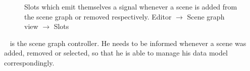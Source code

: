 \documentclass[%
    a4paper,    %
    justified,  %
    nobib,      %
    openany     %
]{tufte-book}
\makeatletter
\renewcommand{\label}[1]{\@tufte@label{##1}}%
\makeatother
\begin{document}
\begin{figure}
\begin{flushleft}
\begin{minipage}{\linewidth}
\begin{list}{}{\setlength{\itemsep}{-\parsep}\setlength{\itemindent}{-\leftmargin}}
\item{}
\end{list}
\end{minipage}\vspace{4ex}
\end{flushleft}
\caption{Slots which emit themselves a signal whenever a scene is added from the
  scene graph or removed respectively.
  \newline{}\newline{}Editor $\rightarrow$ Scene graph view
  $\rightarrow$ Slots}
\label{editor:lst:scene-graph-view:slots:on-tree-item-added-removed}
\end{figure}

~ is the
scene graph controller. He needs to be informed whenever a scene was added,
removed or selected, so that he is able to manage his data model
correspondingly.
\end{document}
